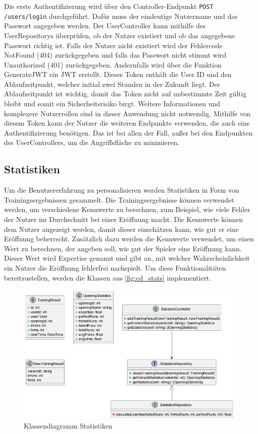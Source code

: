 Die erste Authentifizierung wird über den Controller-Endpunkt \lstinline{POST /users/login} durchgeführt. Dafür muss der eindeutige Nutzername und das Passwort angegeben werden. Der UserController kann mithilfe des UserRepositorys überprüfen, ob der Nutzer existiert und ob das angegebene Passwort richtig ist. Falls der Nutzer nicht existiert wird der Fehlercode NotFound (404) zurückgegeben und falls das Passwort nicht stimmt wird Unauthorized (401) zurückgegeben.
Andernfalls wird über die Funktion GenerateJWT ein \ac{JWT} erstellt. Dieses Token enthält die User ID und den Ablaufzeitpunkt, welcher initial zwei Stunden in der Zukunft liegt. Der Ablaufzeitpunkt ist wichtig, damit das Token nicht auf unbestimmte Zeit gültig bleibt und somit ein Sicherheitsrisiko birgt. Weitere Informationen und komplexere Nutzerrollen sind in dieser Anwendung nicht notwendig. Mithilfe von diesem Token kann der Nutzer die weiteren Endpunkte verwenden, die auch eine Authentifizierung benötigen. Das ist bei allen der Fall, außer bei den Endpunkten des UserControllers, um die Angriffsfläche zu minimieren.

\subsection{Statistiken}
Um die Benutzererfahrung zu personalisieren werden Statistiken in Form von Trainingsergebnissen gesammelt. Die Trainingsergebnisse können verwendet werden, um verschiedene Kennwerte zu berechnen, zum Beispiel, wie viele Fehler der Nutzer im Durchschnitt bei einer Eröffnung macht. Die Kennwerte können dem Nutzer angezeigt werden, damit dieser einschätzen kann, wie gut er eine Eröffnung beherrscht. Zusätzlich dazu werden die Kennwerte verwendet, um einen Wert zu berechnen, der angeben soll, wie gut der Spieler eine Eröffnung kann. Dieser Wert wird Expertise genannt und gibt an, mit welcher Wahrscheinlichkeit ein Nutzer die Eröffnung fehlerfrei nachspielt. Um diese Funktionalitäten bereitzustellen, werden die Klassen aus \autoref{fig:cd_stats} implementiert.

\begin{figure}[h]
    \includegraphics[width=\linewidth]{images/diagrams/stats.png}
    \caption{Klassendiagramm Statistiken}
    \label{fig:cd_stats}
\end{figure}


